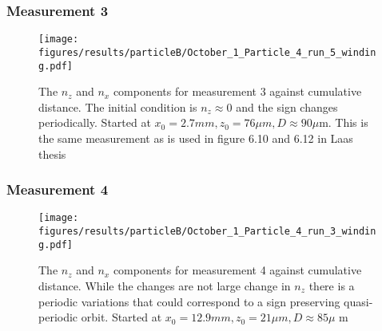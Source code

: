 \subsubsection{Measurement 3}
\begin{figure}[H]
\begin{center}
\texttt{[image: figures/results/particleB/October\_1\_Particle\_4\_run\_5\_winding.pdf]}
\end{center}
\caption{The $n_z$ and $n_x$ components for measurement 3 against cumulative distance. The initial condition is $n_z \approx 0$ and the sign changes periodically. Started at $x_0 = 2.7 mm, z_0 = 76\mu m, D \approx 90\mu$m. This is the same measurement as is used in figure 6.10 and 6.12 in Laas thesis~\cite{alexanderThesis}}
\label{fig:particleB3}
\end{figure}


\subsubsection{Measurement 4}
\begin{figure}[H]
\begin{center}
\texttt{[image: figures/results/particleB/October\_1\_Particle\_4\_run\_3\_winding.pdf]}
\end{center}
\caption{The $n_z$ and $n_x$ components for measurement 4 against cumulative distance. While the changes are not large change in $n_z$ there is a periodic variations that could correspond to a sign preserving quasi-periodic orbit. Started at $x_0 = 12.9 mm, z_0 = 21\mu m, D \approx 85\mu$ m}
\label{fig:particleB4}
\end{figure}